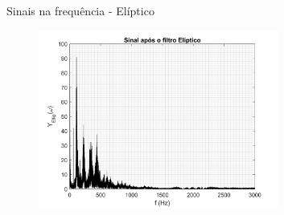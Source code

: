 \begin{frame}{Sinais na frequência - Elíptico}
    \begin{figure}
        \centering
        \includegraphics[width=0.7\textwidth]{graficos/filtrados_f_e.png}
    \end{figure}
\end{frame}